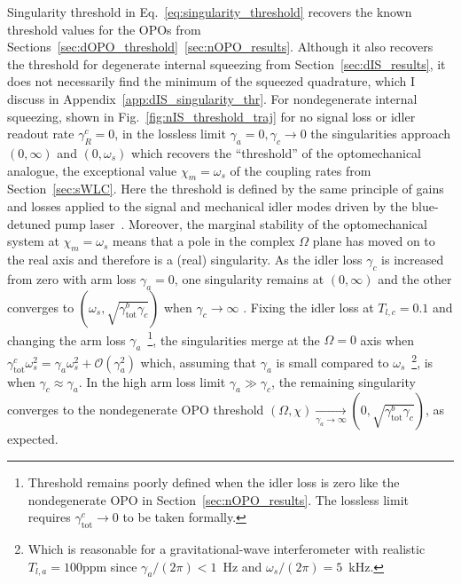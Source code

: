 Singularity threshold in Eq.~\ref{eq:singularity_threshold} recovers the known threshold values for the OPOs from Sections~\ref{sec:dOPO_threshold}~\ref{sec:nOPO_results}. Although it also recovers the threshold for degenerate internal squeezing from Section~\ref{sec:dIS_results}, it does not necessarily find the minimum of the squeezed quadrature, which I discuss in Appendix~\ref{app:dIS_singularity_thr}.
For nondegenerate internal squeezing, shown in Fig.~\ref{fig:nIS_threshold_traj} for no signal loss or idler readout rate $\gamma^c_R=0$, in the lossless limit $\gamma_a=0,\gamma_c\rightarrow0$ the singularities approach $(0,\infty)$ and $(0,\omega_s)$ which recovers the ``threshold'' of the optomechanical analogue, the exceptional value $\chi_m=\omega_s$ of the coupling rates from Section~\ref{sec:sWLC}. Here the threshold is defined by the same principle of gains and losses applied to the signal and mechanical idler modes driven by the blue-detuned pump laser~\cite{}. Moreover, the marginal stability of the optomechanical system at $\chi_m=\omega_s$ means that a pole in the complex $\Omega$ plane has moved on to the real axis and therefore is a (real) singularity. As the idler loss $\gamma_c$ is increased from zero with arm loss $\gamma_a=0$, one singularity remains at $(0,\infty)$ and the other converges to $(\omega_s,\sqrt{\gamma^b_\text{tot}\gamma_c})$ when $\gamma_c\rightarrow\infty$ . Fixing the idler loss at $T_{l,c}=0.1$ and changing the arm loss $\gamma_a$~\footnote{Threshold remains poorly defined when the idler loss is zero  like the nondegenerate OPO in Section~\ref{sec:nOPO_results}. The lossless limit requires $\gamma^c_\text{tot}\rightarrow0$ to be taken formally.}, the singularities merge  at the $\Omega=0$ axis when $\gamma^c_\text{tot}\omega_s^2=\gamma_a\omega_s^2+\mathcal{O}(\gamma_a^2)$ which, assuming that $\gamma_a$ is small compared to $\omega_s$~\footnote{Which is reasonable for a gravitational-wave interferometer with realistic $T_{l,a}=100\text{ppm}$ since $\gamma_a/(2\pi)<1$~Hz and $\omega_s/(2\pi)=5$~kHz.}, is when $\gamma_c\approx\gamma_a$. In the high arm loss limit $\gamma_a\gg\gamma_c$, the remaining singularity converges to the nondegenerate OPO threshold $(\Omega,\chi)\xrightarrow[\gamma_a\rightarrow\infty]{}(0,\sqrt{\gamma^b_\mathrm{tot}\gamma_c})$, as expected.

